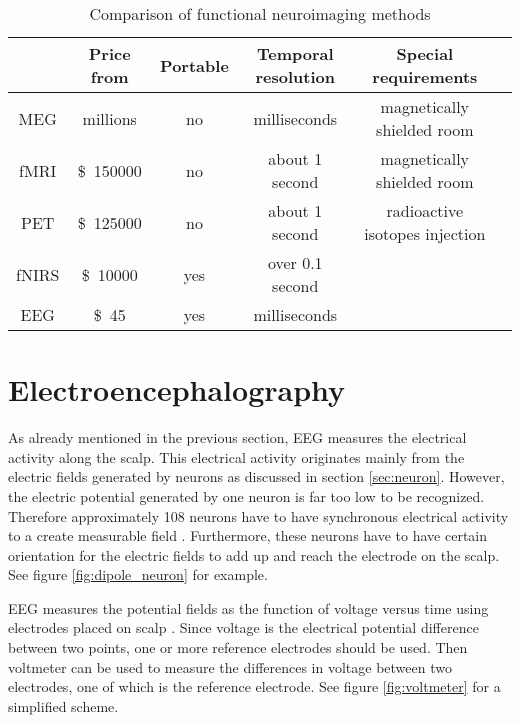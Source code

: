
\begin{table}[h]
	\centering
	\begin{tabular}{|c|c|c|c|c|c|}\hline
			& Price	from				& Portable	& Temporal resolution		& Special requirements			\\\hline
\gls{MEG}	& millions\pMEG				& no		& milliseconds \tresol		& magnetically shielded room	\\\hline
\gls{fMRI}	& \SI{150000}[\$]\pfMRI		& no		& about 1 second \tresol	& magnetically shielded room	\\\hline
\gls{PET}	& \SI{125000}[\$]\pPET		& no		& about 1 second \tresol	& radioactive isotopes injection\\\hline
\gls{fNIRS}	& \SI{10000}[\$]{} \pNIRS	& yes		& over 0.1 second \pNIRS	&								\\\hline
\gls{EEG}	& \SI{45}[\$]\pEEG			& yes		& milliseconds \tresol		&								\\\hline
	\end{tabular}
	\caption{Comparison of functional neuroimaging methods}
	\label{tab:neuroimaging}
\end{table}

\section{Electroencephalography}
\label{sec:EEG}

As already mentioned in the previous section, \gls{EEG} measures the electrical activity along the scalp. This electrical activity originates mainly from the electric fields generated by neurons as discussed in section \ref{sec:neuron}. However, the electric potential generated by one neuron is far too low to be recognized. Therefore approximately 108 neurons have to have synchronous electrical activity to a create measurable field \cite{field_count}. Furthermore, these neurons have to have certain orientation for the electric fields to add up and reach the electrode on the scalp. See figure \ref{fig:dipole_neuron} for example.

\gls{EEG} measures the potential fields as the function of voltage versus time using electrodes placed on scalp \cite{field_count}. Since voltage is the electrical potential difference between two points, one or more reference electrodes should be used. Then voltmeter can be used to measure the differences in voltage between two electrodes, one of which is the reference electrode. See figure \ref{fig:voltmeter} for a simplified scheme.

